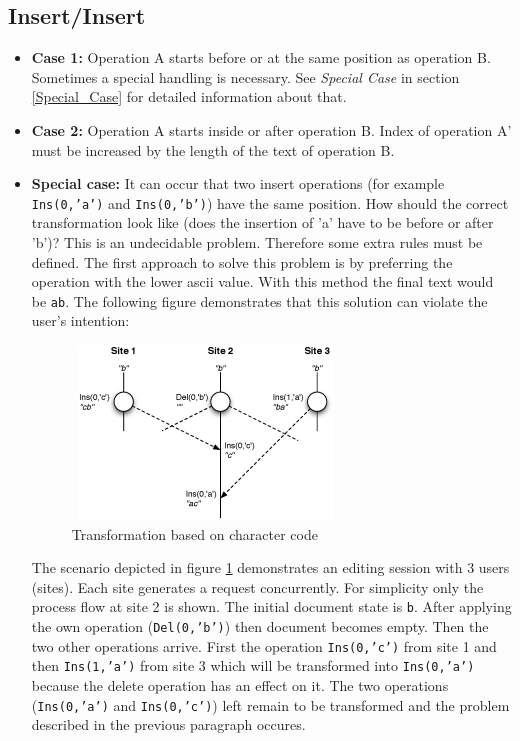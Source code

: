 \subsection{Insert/Insert}
\begin{itemize}
\item \textbf{Case 1:}
Operation A starts before or at the same position as operation B. Sometimes a special handling is necessary. See \emph{Special Case} in section \ref{Special_Case} for detailed information about that.
\item \textbf{Case 2:}
Operation A starts inside or after operation B. Index of operation A' must be increased by the length of the text of operation B.
\item \textbf{Special case:}
\label{Special_Case}
It can occur that two insert operations (for example \texttt{Ins(0,'a')} and \texttt{Ins(0,'b')}) have the same position. How should the correct transformation look like (does the insertion of 'a' have to be before or after 'b')? This is an undecidable problem. Therefore some extra rules must be defined. The first approach to solve this problem is by preferring the operation with the lower ascii value. With this method the final text would be \texttt{ab}. The following figure demonstrates that this solution can violate the user's intention:
\begin{figure}[H]
\centering
\includegraphics[height=4.63cm,width=7.12cm]{../../images/algo-impl/transform_ins_ins_charpos.eps}
\caption{Transformation based on character code}
\label{Transformation based on character code}
\end{figure}
The scenario depicted in figure \ref{Transformation based on character code} demonstrates an editing session with 3 users (sites). Each site generates a request concurrently. For simplicity only the process flow at site 2 is shown. The initial document state is \texttt{b}. After applying the own operation (\texttt{Del(0,'b')}) then document becomes empty. Then the two other operations arrive. First the operation \texttt{Ins(0,'c')} from site 1 and then \texttt{Ins(1,'a')} from site 3 which will be transformed into \texttt{Ins(0,'a')} because the delete operation has an effect on it. The two operations (\texttt{Ins(0,'a')} and \texttt{Ins(0,'c')}) left remain to be transformed and the problem described in the previous paragraph occures.


\end{itemize}
